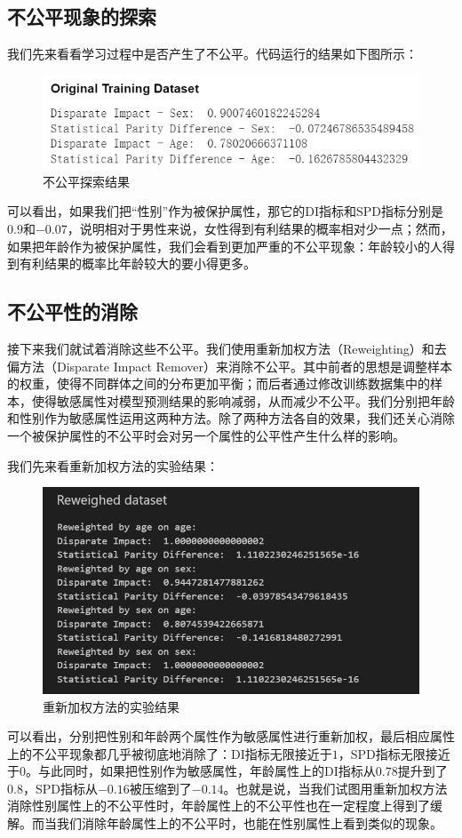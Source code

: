 \documentclass{article}
\begin{document}
\subsection{不公平现象的探索}
我们先来看看学习过程中是否产生了不公平。代码运行的结果如下图所示：
\begin{figure}[h]
    \centering
    \includegraphics[width=0.49\linewidth]{img/image1.png}
    \caption{不公平探索结果}
    \label{fig:enter-label}
\end{figure}
可以看出，如果我们把“性别”作为被保护属性，那它的DI指标和SPD指标分别是$0.9$和$-0.07$，说明相对于男性来说，女性得到有利结果的概率相对少一点；然而，如果把年龄作为被保护属性，我们会看到更加严重的不公平现象：年龄较小的人得到有利结果的概率比年龄较大的要小得更多。

\subsection{不公平性的消除}

接下来我们就试着消除这些不公平。我们使用重新加权方法（Reweighting）和去偏方法（Disparate Impact Remover）来消除不公平。其中前者的思想是调整样本的权重，使得不同群体之间的分布更加平衡；而后者通过修改训练数据集中的样本，使得敏感属性对模型预测结果的影响减弱，从而减少不公平。我们分别把年龄和性别作为敏感属性运用这两种方法。除了两种方法各自的效果，我们还关心消除一个被保护属性的不公平时会对另一个属性的公平性产生什么样的影响。

我们先来看重新加权方法的实验结果：
\begin{figure}[h]
    \centering
    \includegraphics[width=0.58\linewidth]{img/image2.png}
    \caption{重新加权方法的实验结果}
    \label{fig:enter-label}
\end{figure}

可以看出，分别把性别和年龄两个属性作为敏感属性进行重新加权，最后相应属性上的不公平现象都几乎被彻底地消除了：DI指标无限接近于$1$，SPD指标无限接近于$0$。与此同时，如果把性别作为敏感属性，年龄属性上的DI指标从$0.78$提升到了$0.8$，SPD指标从$-0.16$被压缩到了$-0.14$。也就是说，当我们试图用重新加权方法消除性别属性上的不公平性时，年龄属性上的不公平性也在一定程度上得到了缓解。而当我们消除年龄属性上的不公平时，也能在性别属性上看到类似的现象。
\end{document}
